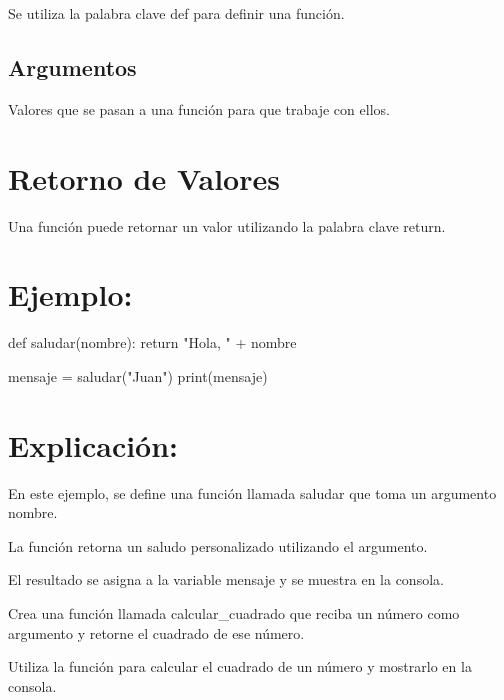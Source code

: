\documentclass[
  a4paper,
  onepage,
  openany]{scrreprt}
\newenvironment{Shaded}{\begin{snugshade}}{\end{snugshade}}
\newcommand{\BuiltInTok}[1]{\textcolor[rgb]{0.00,0.23,0.31}{#1}}
\newcommand{\ControlFlowTok}[1]{\textcolor[rgb]{0.00,0.23,0.31}{#1}}
\newcommand{\KeywordTok}[1]{\textcolor[rgb]{0.00,0.23,0.31}{#1}}
\newcommand{\NormalTok}[1]{\textcolor[rgb]{0.00,0.23,0.31}{#1}}
\newcommand{\OperatorTok}[1]{\textcolor[rgb]{0.37,0.37,0.37}{#1}}
\newcommand{\StringTok}[1]{\textcolor[rgb]{0.13,0.47,0.30}{#1}}
\begin{document}
Se utiliza la palabra clave def para definir una función.

\hypertarget{argumentos-1}{%
\subsection{Argumentos}\label{argumentos-1}}

Valores que se pasan a una función para que trabaje con ellos.

\hypertarget{retorno-de-valores-1}{%
\section{Retorno de Valores}\label{retorno-de-valores-1}}

Una función puede retornar un valor utilizando la palabra clave return.

\hypertarget{ejemplo-45}{%
\section{Ejemplo:}\label{ejemplo-45}}

\begin{Shaded}
\begin{Highlighting}[]
\KeywordTok{def}\NormalTok{ saludar(nombre):}
    \ControlFlowTok{return} \StringTok{"Hola, "} \OperatorTok{+}\NormalTok{ nombre}

\NormalTok{mensaje }\OperatorTok{=}\NormalTok{ saludar(}\StringTok{"Juan"}\NormalTok{)}
\BuiltInTok{print}\NormalTok{(mensaje)}
\end{Highlighting}
\end{Shaded}

\hypertarget{explicaciuxf3n-45}{%
\section{Explicación:}\label{explicaciuxf3n-45}}

En este ejemplo, se define una función llamada saludar que toma un
argumento nombre.

La función retorna un saludo personalizado utilizando el argumento.

El resultado se asigna a la variable mensaje y se muestra en la consola.

\begin{tcolorbox}[enhanced jigsaw, breakable, opacityback=0, toptitle=1mm, coltitle=black, toprule=.15mm, rightrule=.15mm, colframe=quarto-callout-important-color-frame, opacitybacktitle=0.6, arc=.35mm, title=\textcolor{quarto-callout-important-color}{\faExclamation}\hspace{0.5em}{Actividad Práctica:}, titlerule=0mm, colbacktitle=quarto-callout-important-color!10!white, bottomtitle=1mm, bottomrule=.15mm, colback=white, left=2mm, leftrule=.75mm]

Crea una función llamada calcular\_cuadrado que reciba un número como
argumento y retorne el cuadrado de ese número.

Utiliza la función para calcular el cuadrado de un número y mostrarlo en
la consola.

\end{tcolorbox}
\end{document}
